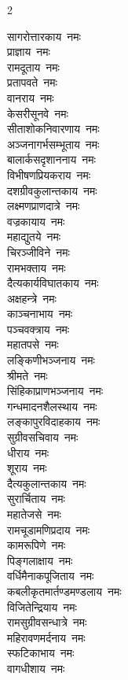 \begin{multicols}{2}
\begin{flushleft}
सागरोत्तारकाय~नमः\\
प्राज्ञाय~नमः\hfill{}\\
रामदूताय~नमः\\
प्रतापवते~नमः\\
वानराय~नमः\\
केसरीसूनवे~नमः\\
सीताशोकनिवारणाय~नमः\\
अञ्जनागर्भसम्भूताय~नमः\\
बालार्कसदृशाननाय~नमः\\
विभीषणप्रियकराय~नमः\\
दशग्रीवकुलान्तकाय~नमः\\
लक्ष्मणप्राणदात्रे~नमः\hfill{}\\
वज्रकायाय~नमः\\
महाद्युतये~नमः\\
चिरञ्जीविने~नमः\\
रामभक्ताय~नमः\\
दैत्यकार्यविघातकाय~नमः\\
अक्षहन्त्रे~नमः\\
काञ्चनाभाय~नमः\\
पञ्चवक्त्राय~नमः\\
महातपसे~नमः\\
लङ्किणीभञ्जनाय~नमः\hfill{}\\
श्रीमते~नमः\\
सिंहिकाप्राणभञ्जनाय~नमः\\
गन्धमादनशैलस्थाय~नमः\\
लङ्कापुरविदाहकाय~नमः\\
सुग्रीवसचिवाय~नमः\\
धीराय~नमः\\
शूराय~नमः\\
दैत्यकुलान्तकाय~नमः\\
सुरार्चिताय~नमः\\
महातेजसे~नमः\hfill{}\\
रामचूडामणिप्रदाय~नमः\\
कामरूपिणे~नमः\\
पिङ्गलाक्षाय~नमः\\
वर्धिमैनाकपूजिताय~नमः\\
कबलीकृत\-मार्तण्डमण्डलाय~नमः\\
विजितेन्द्रियाय~नमः\\
रामसुग्रीवसन्धात्रे~नमः\\
महिरावणमर्दनाय~नमः\\
स्फटिकाभाय~नमः\\
वागधीशाय~नमः\hfill{}\\

\end{flushleft}
\end{multicols}

